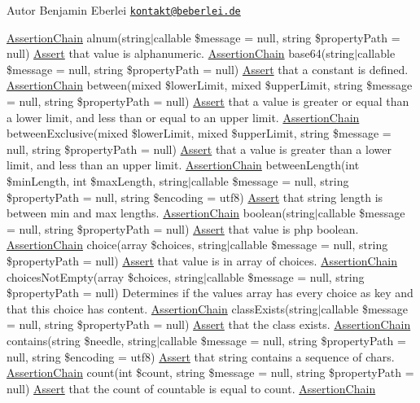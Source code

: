 \begin{DoxyAuthor}{Autor}
Benjamin Eberlei \href{mailto:kontakt@beberlei.de}{\tt kontakt@beberlei.\+de}
\end{DoxyAuthor}
\mbox{\hyperlink{class_assert_1_1_assertion_chain}{Assertion\+Chain}} alnum(string$\vert$callable \$message = null, string \$property\+Path = null) \mbox{\hyperlink{class_assert_1_1_assert}{Assert}} that value is alphanumeric.  \mbox{\hyperlink{class_assert_1_1_assertion_chain}{Assertion\+Chain}} base64(string$\vert$callable \$message = null, string \$property\+Path = null) \mbox{\hyperlink{class_assert_1_1_assert}{Assert}} that a constant is defined.  \mbox{\hyperlink{class_assert_1_1_assertion_chain}{Assertion\+Chain}} between(mixed \$lower\+Limit, mixed \$upper\+Limit, string \$message = null, string \$property\+Path = null) \mbox{\hyperlink{class_assert_1_1_assert}{Assert}} that a value is greater or equal than a lower limit, and less than or equal to an upper limit.  \mbox{\hyperlink{class_assert_1_1_assertion_chain}{Assertion\+Chain}} between\+Exclusive(mixed \$lower\+Limit, mixed \$upper\+Limit, string \$message = null, string \$property\+Path = null) \mbox{\hyperlink{class_assert_1_1_assert}{Assert}} that a value is greater than a lower limit, and less than an upper limit.  \mbox{\hyperlink{class_assert_1_1_assertion_chain}{Assertion\+Chain}} between\+Length(int \$min\+Length, int \$max\+Length, string$\vert$callable \$message = null, string \$property\+Path = null, string \$encoding = \textquotesingle{}utf8\textquotesingle{}) \mbox{\hyperlink{class_assert_1_1_assert}{Assert}} that string length is between min and max lengths.  \mbox{\hyperlink{class_assert_1_1_assertion_chain}{Assertion\+Chain}} boolean(string$\vert$callable \$message = null, string \$property\+Path = null) \mbox{\hyperlink{class_assert_1_1_assert}{Assert}} that value is php boolean.  \mbox{\hyperlink{class_assert_1_1_assertion_chain}{Assertion\+Chain}} choice(array \$choices, string$\vert$callable \$message = null, string \$property\+Path = null) \mbox{\hyperlink{class_assert_1_1_assert}{Assert}} that value is in array of choices.  \mbox{\hyperlink{class_assert_1_1_assertion_chain}{Assertion\+Chain}} choices\+Not\+Empty(array \$choices, string$\vert$callable \$message = null, string \$property\+Path = null) Determines if the values array has every choice as key and that this choice has content.  \mbox{\hyperlink{class_assert_1_1_assertion_chain}{Assertion\+Chain}} class\+Exists(string$\vert$callable \$message = null, string \$property\+Path = null) \mbox{\hyperlink{class_assert_1_1_assert}{Assert}} that the class exists.  \mbox{\hyperlink{class_assert_1_1_assertion_chain}{Assertion\+Chain}} contains(string \$needle, string$\vert$callable \$message = null, string \$property\+Path = null, string \$encoding = \textquotesingle{}utf8\textquotesingle{}) \mbox{\hyperlink{class_assert_1_1_assert}{Assert}} that string contains a sequence of chars.  \mbox{\hyperlink{class_assert_1_1_assertion_chain}{Assertion\+Chain}} count(int \$count, string \$message = null, string \$property\+Path = null) \mbox{\hyperlink{class_assert_1_1_assert}{Assert}} that the count of countable is equal to count.  \mbox{\hyperlink{class_assert_1_1_assertion_chain}{Assertion\+Chain}} 